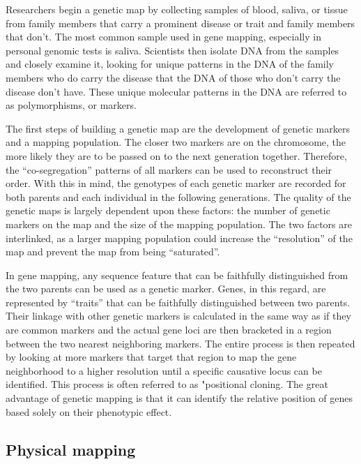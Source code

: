 Researchers begin a genetic map by collecting samples of blood, saliva, or tissue from family members that carry a prominent disease or trait and family members that don't. The most common sample used in gene mapping, especially in personal genomic tests is saliva. Scientists then isolate DNA from the samples and closely examine it, looking for unique patterns in the DNA of the family members who do carry the disease that the DNA of those who don't carry the disease don't have. These unique molecular patterns in the DNA are referred to as polymorphisms, or markers.

The first steps of building a genetic map are the development of genetic markers and a mapping population. The closer two markers are on the chromosome, the more likely they are to be passed on to the next generation together. Therefore, the ``co-segregation'' patterns of all markers can be used to reconstruct their order. With this in mind, the genotypes of each genetic marker are recorded for both parents and each individual in the following generations. The quality of the genetic maps is largely dependent upon these factors: the number of genetic markers on the map and the size of the mapping population. The two factors are interlinked, as a larger mapping population could increase the ``resolution'' of the map and prevent the map from being ``saturated''.

In gene mapping, any sequence feature that can be faithfully distinguished from the two parents can be used as a genetic marker. Genes, in this regard, are represented by ``traits'' that can be faithfully distinguished between two parents. Their linkage with other genetic markers is calculated in the same way as if they are common markers and the actual gene loci are then bracketed in a region between the two nearest neighboring markers. The entire process is then repeated by looking at more markers that target that region to map the gene neighborhood to a higher resolution until a specific causative locus can be identified. This process is often referred to as "positional cloning. The great advantage of genetic mapping is that it can identify the relative position of genes based solely on their phenotypic effect.

\hypertarget{physical-mapping}{%
\subsection{Physical mapping}\label{physical-mapping}}

